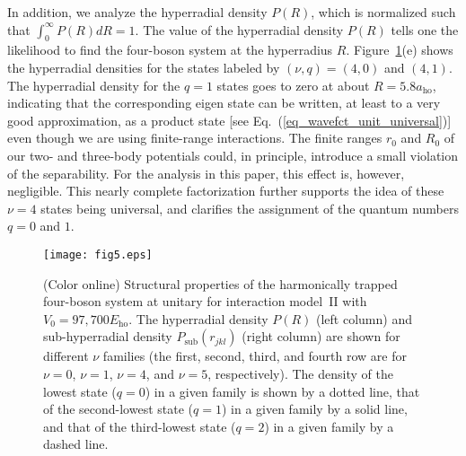 \documentclass[aps,pra,twocolumn,showpacs,superscriptaddress]{revtex4}
\begin{document}
In addition, we analyze the hyperradial density
$P(R)$, which is normalized such that $\int_0^{\infty} P(R) dR=1$.
The value of the hyperradial density
$P(R)$ tells one the likelihood to find the
four-boson system at the hyperradius $R$.
Figure~\ref{fig_hyperradial_n4}(e) 
shows the hyperradial densities
for the states labeled by
$(\nu,q)=(4,0)$ and $(4,1)$. The hyperradial density for the  $q=1$
states goes to zero at about
$R =5.8 a_{\text{ho}}$, indicating that the corresponding eigen state
can be written, at least to a very good approximation, as a 
product state [see Eq.~(\ref{eq_wavefct_unit_universal})]
even though we are using finite-range interactions. 
The finite ranges
$r_0$ and $R_0$ of our two- and three-body potentials
could, in principle, introduce a small violation of the
separability. For the analysis in this paper, this effect is, however, 
negligible.
This nearly complete factorization further supports the
idea of these $\nu=4$ states being universal,
and clarifies the assignment of the quantum numbers $q=0$ and $1$.



\begin{figure}[t]
  \vspace*{0.1in}
\centering
\texttt{[image: fig5.eps]}
\vspace*{.5in}
\caption{(Color online)
Structural properties of the harmonically trapped
four-boson system at unitary for interaction model~II with
$V_0=97,700E_{\text{ho}}$.
The hyperradial density $P(R)$ (left column)
and sub-hyperradial density $P_{\text{sub}}(r_{jkl})$ (right column)
are shown for different
$\nu$ families
(the first, second, third, and fourth row
are for $\nu=0$, $\nu=1$, $\nu=4$, and $\nu=5$,
respectively).
The density of the lowest state ($q=0$) in a given
family is shown by a dotted line,
that of the second-lowest state ($q=1$) in a given
family by a solid line, and
that of the third-lowest state ($q=2$) in a given
family by a dashed line.
}\label{fig_hyperradial_n4}
\end{figure}

\end{document}
